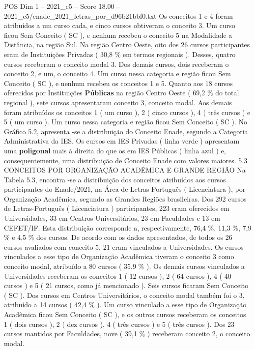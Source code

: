 \begin{textsample}{POS Dim 1 – 2021\_c5 – Score 18.00 – 2021\_c5/enade\_2021\_letras\_por\_d96b21bbf0.txt}
Os conceitos 1 e 4 foram atribuídos a um curso cada, e cinco cursos obtiveram o conceito 3.
Um curso ficou Sem Conceito ( SC ), e nenhum recebeu o conceito 5 na Modalidade a Distância, na região Sul.
Na região Centro Oeste, oito dos 26 cursos participantes eram de Instituições Privadas ( 30,8 \% em termos regionais ).
Desses, quatro cursos receberam o conceito modal 3.
Dos demais cursos, dois receberam o conceito 2, e um, o conceito 4.
Um curso nessa categoria e região ficou Sem Conceito ( SC ), e nenhum recebeu os conceitos 1 e 5.
Quanto aos 18 cursos oferecidos por Instituições \textbf{Públicas} na região Centro Oeste ( 69,2 \% do total regional ), sete cursos apresentaram conceito 3, conceito modal.
Aos demais foram atribuídos os conceitos 1 ( um curso ), 2 ( cinco cursos ), 4 ( três cursos ) e 5 ( um curso ).
Um curso nessa categoria e região ficou Sem Conceito ( SC ).
No Gráfico 5.2, apresenta -se a distribuição do Conceito Enade, segundo a Categoria Administrativa da IES.
Os cursos em IES Privadas ( linha verde ) apresentam uma \textbf{poligonal} mais à direita do que os em IES Públicas ( linha azul ) e, consequentemente, uma distribuição de Conceito Enade com valores maiores. 5.3 CONCEITOS POR ORGANIZAÇÃO ACADÊMICA E GRANDE REGIÃO Na Tabela 5.3, encontra -se a distribuição dos conceitos atribuídos aos cursos participantes do Enade/2021, na Área de Letras-Português ( Licenciatura ), por Organização Acadêmica, segundo as Grandes Regiões brasileiras.
Dos 292 cursos de Letras-Português ( Licenciatura ) participantes, 223 eram oferecidos em Universidades, 33 em Centros Universitários, 23 em Faculdades e 13 em CEFET/IF.
Esta distribuição corresponde a, respectivamente, 76,4 \%, 11,3 \%, 7,9 \% e 4,5 \% dos cursos.
De acordo com os dados apresentados, de todos os 26 cursos avaliados com conceito 5, 21 eram vinculados a Universidades.
Os cursos vinculados a esse tipo de Organização Acadêmica tiveram o conceito 3 como conceito modal, atribuído a 80 cursos ( 35,9 \% ).
Os demais cursos vinculados a Universidades receberam os conceitos 1 ( 12 cursos ), 2 ( 64 cursos ), 4 ( 40 cursos ) e 5 ( 21 cursos, como já mencionado ).
Seis cursos ficaram Sem Conceito ( SC ).
Dos cursos em Centros Universitários, o conceito modal também foi o 3, atribuído a 14 cursos ( 42,4 \% ).
Um curso vinculado a esse tipo de Organização Acadêmica ficou Sem Conceito ( SC ), e os outros cursos receberam os conceitos 1 ( dois cursos ), 2 ( dez cursos ), 4 ( três cursos ) e 5 ( três cursos ).
Dos 23 cursos mantidos por Faculdades, nove ( 39,1 \% ) receberam conceito 2, o conceito modal.

\end{textsample}

